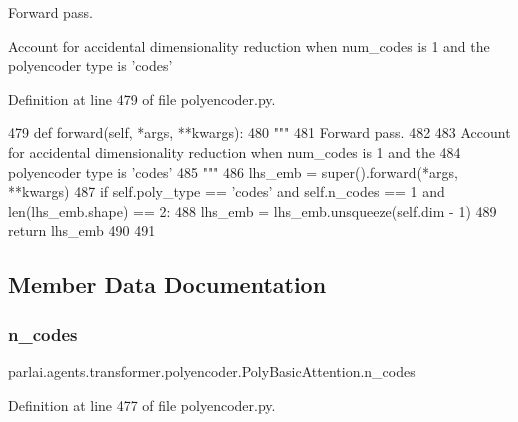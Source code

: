 \begin{DoxyVerb}Forward pass.

Account for accidental dimensionality reduction when num_codes is 1 and the
polyencoder type is 'codes'
\end{DoxyVerb}
 

Definition at line 479 of file polyencoder.\+py.


\begin{DoxyCode}
479     \textcolor{keyword}{def }forward(self, *args, **kwargs):
480         \textcolor{stringliteral}{"""}
481 \textcolor{stringliteral}{        Forward pass.}
482 \textcolor{stringliteral}{}
483 \textcolor{stringliteral}{        Account for accidental dimensionality reduction when num\_codes is 1 and the}
484 \textcolor{stringliteral}{        polyencoder type is 'codes'}
485 \textcolor{stringliteral}{        """}
486         lhs\_emb = super().forward(*args, **kwargs)
487         \textcolor{keywordflow}{if} self.poly\_type == \textcolor{stringliteral}{'codes'} \textcolor{keywordflow}{and} self.n\_codes == 1 \textcolor{keywordflow}{and} len(lhs\_emb.shape) == 2:
488             lhs\_emb = lhs\_emb.unsqueeze(self.dim - 1)
489         \textcolor{keywordflow}{return} lhs\_emb
490 
491 
\end{DoxyCode}


\subsection{Member Data Documentation}
\mbox{\label{classparlai_1_1agents_1_1transformer_1_1polyencoder_1_1PolyBasicAttention_a45603a52525744549d48b10e0bd1b63c}} 
\subsubsection{\texorpdfstring{n\+\_\+codes}{n\_codes}}
{\footnotesize\ttfamily parlai.\+agents.\+transformer.\+polyencoder.\+Poly\+Basic\+Attention.\+n\+\_\+codes}



Definition at line 477 of file polyencoder.\+py.

